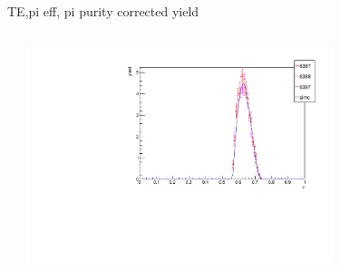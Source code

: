 \begin{frame}{TE,pi eff, pi purity corrected yield}
\begin{columns}
\begin{column}[T]{0.5\textwidth}
\end{column}
\begin{column}[T]{0.5\textwidth}
\includegraphics[width = 0.7\textwidth]{results/yield/check/yieldcheck_230_pos.pdf}
\end{column}
\end{columns}
\end{frame}
